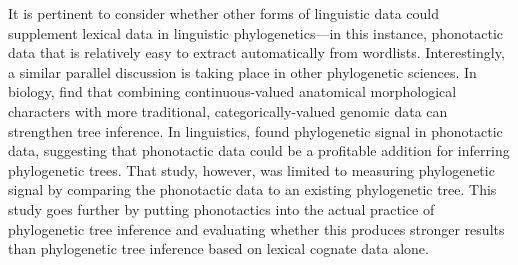 It is pertinent to consider whether other forms of linguistic data could supplement lexical data in linguistic phylogenetics---in this instance, phonotactic data that is relatively easy to extract automatically from wordlists. Interestingly, a similar parallel discussion is taking place in other phylogenetic sciences. In biology, \textcite{parins-fukuchi_use_2018} find that combining continuous-valued anatomical morphological characters with more traditional, categorically-valued genomic data can strengthen tree inference. In linguistics, \textcite{macklin-cordes_phylogenetic_2020} found phylogenetic signal in phonotactic data, suggesting that phonotactic data could be a profitable addition for inferring phylogenetic trees. That study, however, was limited to measuring phylogenetic signal by comparing the phonotactic data to an existing phylogenetic tree. This study goes further by putting phonotactics into the actual practice of phylogenetic tree inference and evaluating whether this produces stronger results than phylogenetic tree inference based on lexical cognate data alone.

